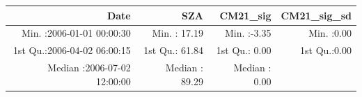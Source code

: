 \documentclass[
  10pt,
  a4paper,oneside]{article}
\begin{document}
\begin{longtable}[]{@{}rrrr@{}}
\toprule
\begin{minipage}[b]{0.34\columnwidth}\raggedleft
Date\strut
\end{minipage} & \begin{minipage}[b]{0.19\columnwidth}\raggedleft
SZA\strut
\end{minipage} & \begin{minipage}[b]{0.18\columnwidth}\raggedleft
CM21\_sig\strut
\end{minipage} & \begin{minipage}[b]{0.18\columnwidth}\raggedleft
CM21\_sig\_sd\strut
\end{minipage}\tabularnewline
\midrule
\endhead
\begin{minipage}[t]{0.34\columnwidth}\raggedleft
Min. :2006-01-01 00:00:30\strut
\end{minipage} & \begin{minipage}[t]{0.19\columnwidth}\raggedleft
Min. : 17.19\strut
\end{minipage} & \begin{minipage}[t]{0.18\columnwidth}\raggedleft
Min. :-3.35\strut
\end{minipage} & \begin{minipage}[t]{0.18\columnwidth}\raggedleft
Min. :0.00\strut
\end{minipage}\tabularnewline
\begin{minipage}[t]{0.34\columnwidth}\raggedleft
1st Qu.:2006-04-02 06:00:15\strut
\end{minipage} & \begin{minipage}[t]{0.19\columnwidth}\raggedleft
1st Qu.: 61.84\strut
\end{minipage} & \begin{minipage}[t]{0.18\columnwidth}\raggedleft
1st Qu.: 0.00\strut
\end{minipage} & \begin{minipage}[t]{0.18\columnwidth}\raggedleft
1st Qu.:0.00\strut
\end{minipage}\tabularnewline
\begin{minipage}[t]{0.34\columnwidth}\raggedleft
Median :2006-07-02 12:00:00\strut
\end{minipage} & \begin{minipage}[t]{0.19\columnwidth}\raggedleft
Median : 89.29\strut
\end{minipage} & \begin{minipage}[t]{0.18\columnwidth}\raggedleft
Median : 0.00\strut
\end{minipage} & \begin{minipage}[t]{0.18\columnwidth}\raggedleft

\end{minipage}
\end{longtable}
\end{document}
